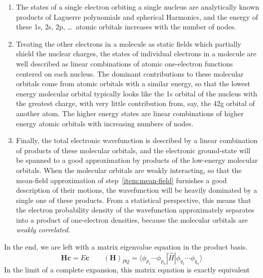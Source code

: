 \begin{enumerate}
    \item
        \label{item:atomic-orbitals}
        The states of a single electron orbiting a single nucleus are
        analytically known products of Laguerre polynomials and spherical
        Harmonics, and the energy of these 1s, 2s, 2p, \dots\ atomic orbitals
        increases with the number of nodes.
    \item
        \label{item:mean-field}
        Treating the other electrons in a molecule as static fields which
        partially shield the nuclear charges, the states of individual electrons
        in a molecule are well described as linear combinations of atomic
        one-electron functions centered on each nucleus.
        The dominant contributions to these molecular orbitals come from atomic
        orbitals with a similar energy, so that the lowest energy molecular
        orbital typically looks like the 1s orbital of the nucleus with the
        greatest charge, with very little contribution from, say, the 42g
        orbital of another atom.
        The higher energy states are linear combinations of higher energy atomic
        orbitals with increasing numbers of nodes.
    \item
        \label{item:full-ci}
        Finally, the total electronic wavefunction is described by a linear
        combination of products of these molecular orbitals, and the electronic
        ground-state will be spanned to a good approximation by products of the
        low-energy molecular orbitals.
        When the molecular orbitals are weakly interacting, so that the
        mean-field approximation of step~\ref{item:mean-field} furnishes a good
        description of their motions, the wavefunction will be heavily dominated
        by a single one of these products.
        From a statistical perspective, this means that the electron probability
        density of the wavefunction approximately separates into a product of
        one-electron densities, because the molecular orbitals are {\itshape
        weakly correlated}.
\end{enumerate}
In the end, we are left with a matrix eigenvalue equation in the product basis.
\begin{equation}
    \mathbf{H}\mathbf{c}
    =
    E\mathbf{c}
    \qquad
    (\mathbf{H})_{PQ}
    =
    \langle \phi_{p_1}\cdots \phi_{p_n}|
    \hat{H}
    |\phi_{q_1}\cdots \phi_{q_n} \rangle
\end{equation}
In the limit of a complete expansion, this matrix equation is exactly equivalent
